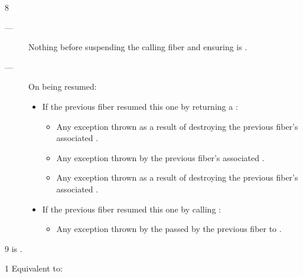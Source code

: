 8 \except
\begin{description}
    \item[---] Nothing before suspending the calling fiber and
               ensuring \emptyfn is \true.
    \item[---] On being resumed:
    \begin{itemize}
        \item If the previous fiber resumed this one by returning a \fiber:
            \begin{itemize}
                \item Any exception thrown as a result of destroying the
                      previous fiber's associated .
                \item Any exception thrown by the previous fiber's
                      associated .
                \item Any exception thrown as a result of destroying the
                      previous fiber's associated .
            \end{itemize}
        \item If the previous fiber resumed this one by calling \anyresumewith:
        \begin{itemize}
            \item Any exception thrown by the  passed by the previous
                  fiber to \anyresumewith.
        \end{itemize}
    \end{itemize}
\end{description}

9 \postcond
\emptyfn is \true.




1 \effects
Equivalent to:\\

